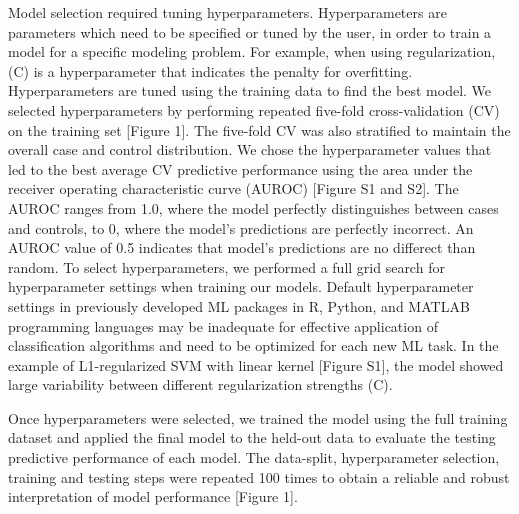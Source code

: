 \documentclass[11pt,]{article}
\begin{document}
Model selection required tuning hyperparameters. Hyperparameters are
parameters which need to be specified or tuned by the user, in order to
train a model for a specific modeling problem. For example, when using
regularization, (C) is a hyperparameter that indicates the penalty for
overfitting. Hyperparameters are tuned using the training data to find
the best model. We selected hyperparameters by performing repeated
five-fold cross-validation (CV) on the training set {[}Figure 1{]}. The
five-fold CV was also stratified to maintain the overall case and
control distribution. We chose the hyperparameter values that led to the
best average CV predictive performance using the area under the receiver
operating characteristic curve (AUROC) {[}Figure S1 and S2{]}. The AUROC
ranges from 1.0, where the model perfectly distinguishes between cases
and controls, to 0, where the model's predictions are perfectly
incorrect. An AUROC value of 0.5 indicates that model's predictions are
no differect than random. To select hyperparameters, we performed a full
grid search for hyperparameter settings when training our models.
Default hyperparameter settings in previously developed ML packages in
R, Python, and MATLAB programming languages may be inadequate for
effective application of classification algorithms and need to be
optimized for each new ML task. In the example of L1-regularized SVM
with linear kernel {[}Figure S1{]}, the model showed large variability
between different regularization strengths (C).

Once hyperparameters were selected, we trained the model using the full
training dataset and applied the final model to the held-out data to
evaluate the testing predictive performance of each model. The
data-split, hyperparameter selection, training and testing steps were
repeated 100 times to obtain a reliable and robust interpretation of
model performance {[}Figure 1{]}.
\end{document}
